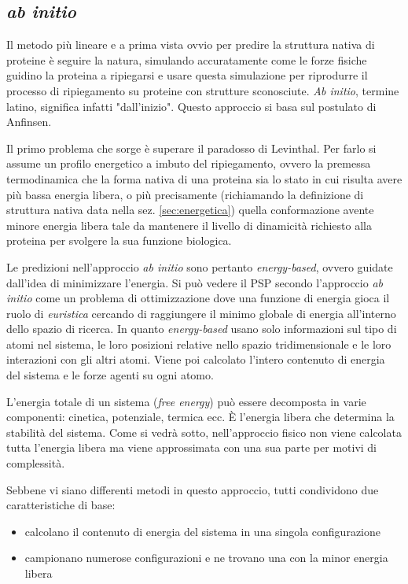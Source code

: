 \subsection{\textit{ab initio}} \label{sec:ab-initio}
{
Il metodo più lineare e a prima vista ovvio per predire la struttura nativa di proteine è seguire la natura, simulando accuratamente come le forze fisiche guidino la proteina a ripiegarsi e usare questa simulazione per riprodurre il processo di ripiegamento su proteine con strutture sconosciute. \textit{Ab initio}, termine latino, significa infatti "dall'inizio". Questo approccio si basa sul postulato di Anfinsen.

\par Il primo problema che sorge è superare il paradosso di Levinthal. Per farlo si assume un profilo energetico a imbuto del ripiegamento, ovvero la premessa termodinamica che la forma nativa di una proteina sia lo stato in cui risulta avere più bassa energia libera, o più precisamente (richiamando la definizione di struttura nativa data nella sez. \ref{sec:energetica}) quella conformazione avente minore energia libera tale da mantenere il livello di dinamicità richiesto alla proteina per svolgere la sua funzione biologica.

\par Le predizioni nell'approccio \textit{ab initio} sono pertanto \textit{energy-based}, ovvero guidate dall'idea di minimizzare l'energia. Si può vedere il PSP secondo l'approccio \textit{ab initio} come un problema di ottimizzazione dove una funzione di energia gioca il ruolo di \textit{euristica} cercando di raggiungere il minimo globale di energia all'interno dello spazio di ricerca. In quanto \textit{energy-based} usano solo informazioni sul tipo di atomi nel sistema, le loro posizioni relative nello spazio tridimensionale e le loro interazioni con gli altri atomi. Viene poi calcolato l'intero contenuto di energia del sistema e le forze agenti su ogni atomo. 

\par L'energia totale di un sistema (\textit{free energy}) può essere decomposta in varie componenti: cinetica, potenziale, termica ecc. È l'energia libera che determina la stabilità del sistema. Come si vedrà sotto, nell'approccio fisico non viene calcolata tutta l'energia libera ma viene approssimata con una sua parte per motivi di complessità.

\par Sebbene vi siano differenti metodi in questo approccio, tutti condividono due caratteristiche di base:
\begin{itemize}
	\item calcolano il contenuto di energia del sistema in una singola configurazione
	\item campionano numerose configurazioni e ne trovano una con la minor energia libera
\end{itemize}

}
